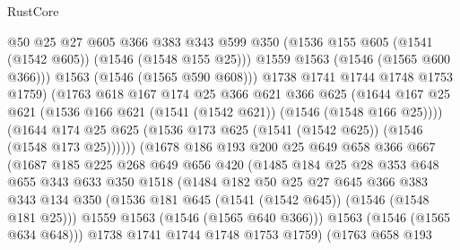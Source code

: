 \begin{lexlean}{RustCore}
\begin{coremodule}
                      @50
                      @25
                      @27
                      @605
                      @366
                      @383
                      @343
                      @599
                      @350
                      (@1536 @155 @605 (@1541 (@1542 @605)) (@1546 (@1548 @155 @25)))
                      @1559
                      @1563
                      (@1546 (@1565 @600 @366)))
                    @1563
                    (@1546 (@1565 @590 @608)))
                  @1738
                  @1741
                  @1744
                  @1748
                  @1753
                  @1759)
                (@1763
                  @618
                  @167
                  @174
                  @25
                  @366
                  @621
                  @366
                  @625
                  (@1644
                    @167
                    @25
                    @621
                    (@1536 @166 @621 (@1541 (@1542 @621)) (@1546 (@1548 @166 @25))))
                  (@1644
                    @174
                    @25
                    @625
                    (@1536 @173 @625 (@1541 (@1542 @625)) (@1546 (@1548 @173 @25))))))
              (@1678
                @186
                @193
                @200
                @25
                @649
                @658
                @366
                @667
                (@1687
                  @185
                  @225
                  @268
                  @649
                  @656
                  @420
                  (@1485
                    @184
                    @25
                    @28
                    @353
                    @648
                    @655
                    @343
                    @633
                    @350
                    @1518
                    (@1484
                      @182
                      @50
                      @25
                      @27
                      @645
                      @366
                      @383
                      @343
                      @134
                      @350
                      (@1536 @181 @645 (@1541 (@1542 @645)) (@1546 (@1548 @181 @25)))
                      @1559
                      @1563
                      (@1546 (@1565 @640 @366)))
                    @1563
                    (@1546 (@1565 @634 @648)))
                  @1738
                  @1741
                  @1744
                  @1748
                  @1753
                  @1759)
                (@1763
                  @658
                  @193

\end{coremodule}
\end{lexlean}

